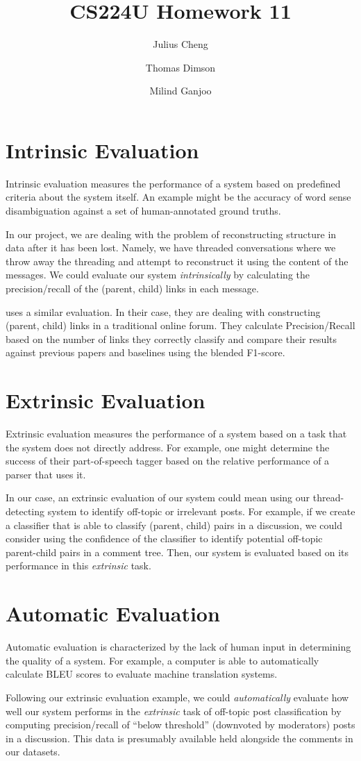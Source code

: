 \documentclass{article}
\title{CS224U Homework 11}
\author{
Julius Cheng \and
Thomas Dimson \and
Milind Ganjoo
}
\begin{document}
\maketitle

\section*{Intrinsic Evaluation}
Intrinsic evaluation measures the performance of a system
based on predefined criteria about the system itself. An example
might be the accuracy of word sense disambiguation against
a set of human-annotated ground truths. 

In our project, we are dealing with the problem of reconstructing
structure in data after it has been lost. Namely, we have threaded
conversations where we throw away the threading and attempt to 
reconstruct it using the content of the messages. We could evaluate
our system \textit{intrinsically} by calculating the precision/recall of the 
(parent, child) links in each message.

\cite{Aumayr2011a} uses a similar evaluation. In their case,
they are dealing with constructing (parent, child) links in a traditional
online forum. They calculate Precision/Recall based on the number of 
links they correctly classify and compare their results against previous
papers and baselines using the blended F1-score.

\section*{Extrinsic Evaluation}
Extrinsic evaluation measures the performance of a system
based on a task that the system does not directly address. For example,
one might determine the success of their part-of-speech tagger
based on the relative performance of a parser that uses it.

In our
case, an extrinsic evaluation of our system could mean using our
thread-detecting system to identify off-topic or irrelevant posts. For example,
if we create a classifier that is able to classify (parent, child) pairs in a
discussion, we could consider using the confidence of the classifier to
identify potential off-topic parent-child pairs in a comment tree. Then, our
system is evaluated based on its performance in this \textit{extrinsic} task.

\section*{Automatic Evaluation}
Automatic evaluation is characterized by the lack of human
input in determining the quality of a system. For example, a computer
is able to automatically calculate BLEU scores to evaluate machine
translation systems.

Following our extrinsic evaluation example, we could \textit{automatically}
evaluate how well our system performs in the \textit{extrinsic} task 
of off-topic post classification by computing precision/recall
of ``below threshold'' (downvoted by moderators) posts in a discussion. This
data is presumably available held alongside the comments in our datasets.


{} 

\end{document}
